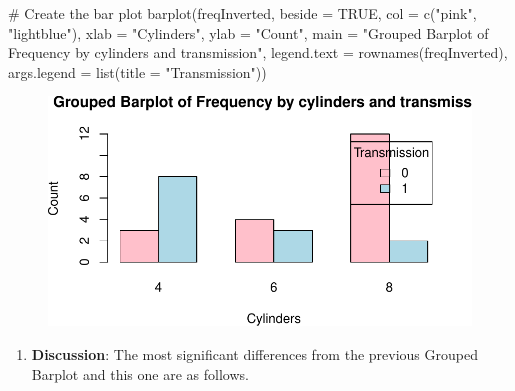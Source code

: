 \documentclass[
  letterpaper,
  DIV=11,
  numbers=noendperiod]{scrreport}
\newenvironment{Shaded}{\begin{snugshade}}{\end{snugshade}}
\newcommand{\AttributeTok}[1]{\textcolor[rgb]{0.40,0.45,0.13}{#1}}
\newcommand{\CommentTok}[1]{\textcolor[rgb]{0.37,0.37,0.37}{#1}}
\newcommand{\ConstantTok}[1]{\textcolor[rgb]{0.56,0.35,0.01}{#1}}
\newcommand{\FunctionTok}[1]{\textcolor[rgb]{0.28,0.35,0.67}{#1}}
\newcommand{\NormalTok}[1]{\textcolor[rgb]{0.00,0.23,0.31}{#1}}
\newcommand{\StringTok}[1]{\textcolor[rgb]{0.13,0.47,0.30}{#1}}
\providecommand{\tightlist}{%
  \setlength{\itemsep}{0pt}\setlength{\parskip}{0pt}}\usepackage{longtable,booktabs,array}
\begin{document}
\begin{Shaded}
\begin{Highlighting}[]
\CommentTok{\# Create the bar plot}
\FunctionTok{barplot}\NormalTok{(freqInverted, }
        \AttributeTok{beside =} \ConstantTok{TRUE}\NormalTok{, }
        \AttributeTok{col =} \FunctionTok{c}\NormalTok{(}\StringTok{"pink"}\NormalTok{, }\StringTok{"lightblue"}\NormalTok{), }
        \AttributeTok{xlab =} \StringTok{"Cylinders"}\NormalTok{, }\AttributeTok{ylab =} \StringTok{"Count"}\NormalTok{, }
        \AttributeTok{main =} \StringTok{"Grouped Barplot of Frequency by cylinders and transmission"}\NormalTok{, }
        \AttributeTok{legend.text =} \FunctionTok{rownames}\NormalTok{(freqInverted), }
        \AttributeTok{args.legend =} \FunctionTok{list}\NormalTok{(}\AttributeTok{title =} \StringTok{"Transmission"}\NormalTok{))}
\end{Highlighting}
\end{Shaded}

\begin{figure}[H]

{\centering \includegraphics{08CategoricalData02_files/figure-pdf/unnamed-chunk-17-1.pdf}

}

\end{figure}

\begin{enumerate}
\def\labelenumi{\arabic{enumi}.}
\setcounter{enumi}{4}
\tightlist
\item
  \textbf{Discussion}: The most significant differences from the
  previous Grouped Barplot and this one are as follows.
\end{enumerate}
\end{document}
